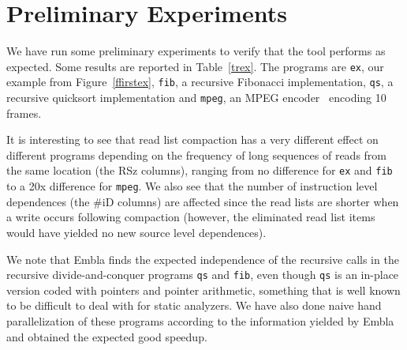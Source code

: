 \documentclass[times, 10pt,twocolumn]{article}
\begin{document}
\section{Preliminary Experiments}

We have run some preliminary experiments to verify that the tool performs as
expected. Some results are reported in Table~\ref{trex}. The programs are 
{\tt ex}, our example from Figure~\ref{ffirstex}, {\tt fib}, a recursive
Fibonacci implementation, {\tt qs}, a recursive quicksort implementation 
and {\tt mpeg}, an MPEG encoder~\cite{MPEG} encoding 10 frames.

It is interesting
to see that read list compaction has a very different effect on different 
programs depending on the frequency of long sequences of reads from the same 
location (the RSz columns), ranging from no difference for {\tt ex} and 
{\tt fib} to a 20x difference for {\tt mpeg}. We also see that the number of 
instruction 
level dependences (the \#iD columns) are affected since the read lists 
are shorter when a write occurs following compaction (however, the 
eliminated read list 
items would have yielded no new source level dependences).

We note that Embla finds the expected independence of the recursive calls 
in the recursive divide-and-conquer programs {\tt qs} and
{\tt fib}, even though {\tt qs} is an in-place version coded 
with pointers and pointer arithmetic, something that is well known to be 
difficult to deal with for static analyzers. We have also done naive
hand parallelization of these programs according to the information 
yielded by Embla and obtained the expected good speedup.
\end{document}
